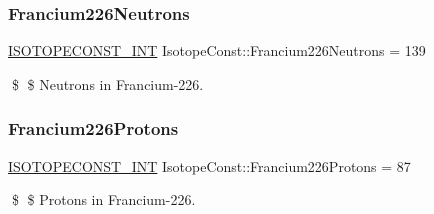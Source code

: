 \subsubsection{\texorpdfstring{Francium226\+Neutrons}{Francium226Neutrons}}
{\footnotesize\ttfamily \mbox{\hyperlink{group___isotope_const-_macros_ga5f18360b3e99483a35c32d789e62621c}{I\+S\+O\+T\+O\+P\+E\+C\+O\+N\+S\+T\+\_\+\+I\+NT}} Isotope\+Const\+::\+Francium226\+Neutrons = 139}

\$ \$ Neutrons in Francium-\/226. \mbox{\label{group___isotope_const-_francium-_fr226_gae51e9bc274e31c49a639ebe36efad965}} 
\subsubsection{\texorpdfstring{Francium226\+Protons}{Francium226Protons}}
{\footnotesize\ttfamily \mbox{\hyperlink{group___isotope_const-_macros_ga5f18360b3e99483a35c32d789e62621c}{I\+S\+O\+T\+O\+P\+E\+C\+O\+N\+S\+T\+\_\+\+I\+NT}} Isotope\+Const\+::\+Francium226\+Protons = 87}

\$ \$ Protons in Francium-\/226. 